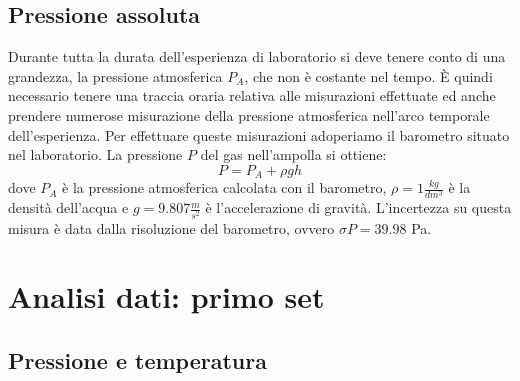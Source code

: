 \subsection{Pressione assoluta}
Durante tutta la durata dell'esperienza di laboratorio si deve tenere conto di una grandezza, la pressione atmosferica $P_A$, che non è costante nel tempo.
È quindi necessario tenere una traccia oraria relativa alle misurazioni effettuate ed anche prendere numerose misurazione della pressione atmosferica nell'arco temporale dell'esperienza.
Per effettuare queste misurazioni adoperiamo il barometro situato nel laboratorio.
La pressione $P$ del gas nell'ampolla si ottiene:
\begin{equation}
P = P_A + \rho g h
\end{equation}
dove $P_A$ è la pressione atmosferica calcolata con il barometro, $\rho = 1 \frac{kg}{dm^3}$ è la densità dell'acqua e $g = 9.807 \frac{m}{s^2}$
è l'accelerazione di gravità.
L'incertezza su questa misura è data dalla risoluzione del barometro, ovvero $\sigma P = 39.98$ Pa.

\section{Analisi dati: primo set}
\subsection{Pressione e temperatura}

